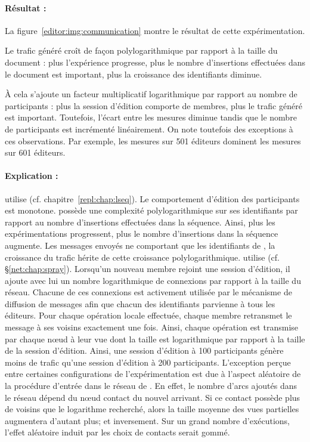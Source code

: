 \paragraph{Résultat :} La figure~\ref{editor:img:communication} montre le
résultat de cette expérimentation.
\begin{inparaenum}[(i)]
\item Le trafic généré croît de façon polylogarithmique par rapport à la taille
  du document : plus l'expérience progresse, plus le nombre d'insertions
  effectuées dans le document est important, plus la croissance des identifiants
  diminue.
\item À cela s'ajoute un facteur multiplicatif logarithmique par rapport au
  nombre de participants : plus la session d'édition comporte de membres, plus
  le trafic généré est important. Toutefois, l'écart entre les mesures diminue
  tandis que le nombre de participants est incrémenté linéairement. On note
  toutefois des exceptions à ces observations. Par exemple, les mesures sur 501
  éditeurs dominent les mesures sur 601 éditeurs.
\end{inparaenum}

\paragraph{Explication :} \CRATE utilise \LSEQ
(cf. chapitre~\ref{repl:chap:lseq}). Le comportement d'édition des participants
est monotone. \LSEQ possède une complexité polylogarithmique sur ses
identifiants par rapport au nombre d'insertions effectuées dans la
séquence. Ainsi, plus les expérimentations progressent, plus le nombre
d'insertions dans la séquence augmente. Les messages envoyés ne comportant que
les identifiants de \LSEQ, la croissance du trafic hérite de cette croissance
polylogarithmique. \CRATE utilise \SPRAY (cf. §\ref{net:chap:spray}). Lorsqu'un
nouveau membre rejoint une session d'édition, il ajoute avec lui un nombre
logarithmique de connexions par rapport à la taille du réseau. Chacune de ces
connexions est activement utilisée par le mécanisme de diffusion de messages
afin que chacun des identifiants parvienne à tous les éditeurs. Pour chaque
opération locale effectuée, chaque membre retransmet le message à ses voisins
exactement une fois. Ainsi, chaque opération est transmise par chaque nœud à
leur vue dont la taille est logarithmique par rapport à la taille de la session
d'édition. Ainsi, une session d'édition à 100 participants génère moins de
trafic qu'une session d'édition à 200 participants. L'exception perçue entre
certaines configurations de l'expérimentation est due à l'aspect aléatoire de la
procédure d'entrée dans le réseau de \SPRAY. En effet, le nombre d'arcs ajoutés
dans le réseau dépend du nœud contact du nouvel arrivant. Si ce contact possède
plus de voisins que le logarithme recherché, alors la taille moyenne des vues
partielles augmentera d'autant plus; et inversement.  Sur un grand nombre
d'exécutions, l'effet aléatoire induit par les choix de contacts serait gommé.



